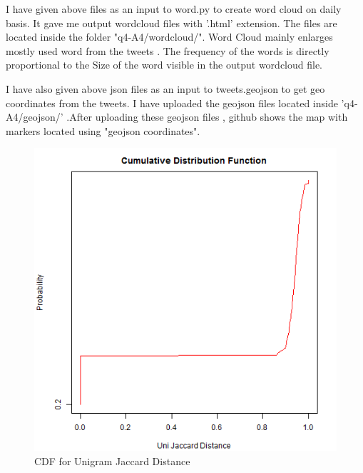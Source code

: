 \documentclass[12pt]{Report}
\begin{document}
I have given above files as an input to word.py to create word cloud on daily basis. It gave me output wordcloud files with '.html' extension.
The files are located inside the folder "q4-A4/wordcloud/". Word Cloud mainly enlarges mostly used word from the tweets . The frequency of the words is directly proportional to the Size of the word visible in the output wordcloud file.

I have also given above json files as an input to tweets.geojson to get geo coordinates from the tweets.
 I have uploaded the geojson files located inside 'q4-A4/geojson/'  .After uploading these geojson files , github shows the map with markers located using "geojson coordinates".  
 

\begin{figure}[ht]    
    \begin{center}
        \includegraphics[scale=0.60]{unigram.png}
        \caption{CDF for Unigram Jaccard Distance }
        \label{UniGram Jaccard Distance}
    \end{center}
\end{figure}
\newpage
 
\end{document}
